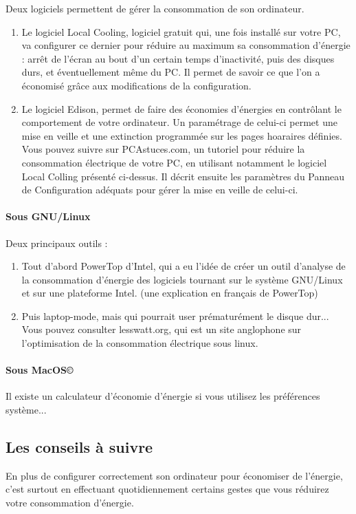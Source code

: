 \documentclass[a4paper,11pt,french]{article}
\begin{document}
Deux logiciels permettent de gérer la consommation de son ordinateur.
\begin{enumerate}
\item Le logiciel Local Cooling, logiciel gratuit qui, une fois installé sur votre PC, va configurer ce dernier pour réduire au maximum sa consommation d'énergie : arrêt de l'écran au bout d'un certain temps d'inactivité, puis des disques durs, et éventuellement même du PC. Il permet de savoir ce que l'on a économisé grâce aux modifications de la configuration.
\item Le logiciel Edison, permet de faire des économies d'énergies en contrôlant le comportement de votre ordinateur. Un paramétrage de celui-ci permet une mise en veille et une extinction programmée sur les pages hoaraires définies.
Vous pouvez suivre sur PCAstuces.com, un tutoriel pour réduire la consommation électrique de votre PC, en utilisant notamment le logiciel Local Colling présenté ci-dessus. Il décrit ensuite les paramètres du Panneau de Configuration adéquats pour gérer la mise en veille de celui-ci.
\end{enumerate}

\paragraph{Sous GNU/Linux}
Deux principaux outils :

\begin{enumerate}
\item Tout d'abord PowerTop d'Intel, qui a eu l'idée de créer un outil d'analyse de la consommation d'énergie des logiciels tournant sur le système GNU/Linux et sur une plateforme Intel. (une explication en français de PowerTop)
\item Puis laptop-mode, mais qui pourrait user prématurément le disque dur...
Vous pouvez consulter lesswatt.org, qui est un site anglophone sur l'optimisation de la consommation électrique sous linux.
\end{enumerate}

\paragraph{Sous MacOS\copyright}
Il existe un calculateur d'économie d'énergie si vous utilisez les préférences système...



\subsection{Les conseils à suivre}
En plus de configurer correctement son ordinateur pour économiser de l'énergie, c'est surtout en effectuant quotidiennement certains gestes que vous réduirez votre consommation d'énergie.\\
\end{document}
